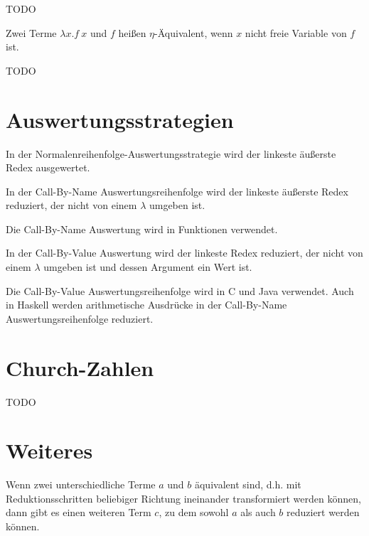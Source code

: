 \begin{beispiel}
	TODO
\end{beispiel}

\begin{definition}
	Zwei Terme $\lambda x. f~x$ und $f$ heißen $\eta$-Äquivalent, wenn
	$x$ nicht freie Variable von $f$ ist.
\end{definition}

\begin{beispiel}
	TODO
\end{beispiel}

\section{Auswertungsstrategien}
\begin{definition}[Normalenreihenfolge]%
	In der Normalenreihenfolge-Auswertungsstrategie wird der linkeste äußerste
	Redex ausgewertet.
\end{definition}

\begin{definition}%
	In der Call-By-Name Auswertungsreihenfolge wird der linkeste äußerste Redex
	reduziert, der nicht von einem $\lambda$ umgeben ist.
\end{definition}

Die Call-By-Name Auswertung wird in Funktionen verwendet.

\begin{definition}%
	In der Call-By-Value Auswertung wird der linkeste Redex reduziert, der
	nicht von einem $\lambda$ umgeben ist und dessen Argument ein Wert ist.
\end{definition}

Die Call-By-Value Auswertungsreihenfolge wird in C und Java verwendet.
Auch in Haskell werden arithmetische Ausdrücke in der Call-By-Name Auswertungsreihenfolge
reduziert.

\section{Church-Zahlen}
TODO

\section{Weiteres}

\begin{satz}
	Wenn zwei unterschiedliche Terme $a$ und $b$ äquivalent sind, d.h. mit Reduktionsschritten beliebiger Richtung ineinander transformiert werden können, dann gibt es einen weiteren Term $c$, zu dem sowohl $a$ als auch $b$ reduziert werden können.
\end{satz}